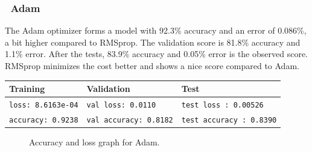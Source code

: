 \documentclass[lnbip]{svmultln}
\newcommand{\myfloatalign}{\centering}
\begin{document}
	\subsubsection*{\qquad \textbullet \ \textbf{Adam}}
	The Adam optimizer forms a model with 92.3\% accuracy and an error of 0.086\%, a bit higher compared to RMSprop. The validation score is 81.8\% accuracy and 1.1\% error. After the tests, 83.9\% accuracy and 0.05\% error is the observed score. RMSprop minimizes the cost better and shows a nice score compared to Adam.
	\begin{table}[H]
		\centering
		\begin{tabular}{l|l|l}
			\hline
			\textbf{Training} & \textbf{Validation} & \textbf{Test} \\
			\hline
			
			\texttt{loss: 8.6163e-04} & \texttt{val loss: 0.0110} & \texttt{test loss : 0.00526} \\
			\texttt{accuracy: 0.9238} & \texttt{val accuracy: 0.8182} & \texttt{test accuracy : 0.8390} \\
			
			\hline
			
		\end{tabular}
	\end{table}
	\begin{figure}[H]
		\myfloatalign
		 \quad
		
		\caption[]{Accuracy and loss graph for Adam.}
	\end{figure}
\end{document}
